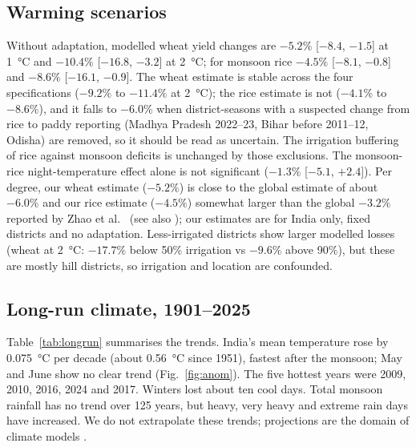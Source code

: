 \documentclass[conference]{IEEEtran}
\begin{document}
\subsection{Warming scenarios}
Without adaptation, modelled wheat yield changes are $-5.2\%$ [$-8.4$, $-1.5$] at \SI{+1}{\degreeCelsius} and
$-10.4\%$ [$-16.8$, $-3.2$] at \SI{+2}{\degreeCelsius}; for monsoon rice $-4.5\%$ [$-8.1$, $-0.8$] and $-8.6\%$
[$-16.1$, $-0.9$]. The wheat estimate is stable across the four specifications ($-9.2\%$ to $-11.4\%$ at
\SI{+2}{\degreeCelsius}); the rice estimate is not ($-4.1\%$ to $-8.6\%$), and it falls to $-6.0\%$ when district-seasons with a suspected change from rice to paddy reporting (Madhya Pradesh 2022--23, Bihar before 2011--12, Odisha) are removed, so it should be read as uncertain. The irrigation buffering of rice against monsoon deficits is unchanged by those exclusions. The
monsoon-rice night-temperature effect alone is not significant ($-1.3\%$ [$-5.1$, $+2.4$]). Per degree, our wheat
estimate ($-5.2\%$) is close to the global estimate of about $-6.0\%$ and our rice estimate ($-4.5\%$) somewhat larger than the global $-3.2\%$ reported by Zhao et al.\ \cite{zhao2017}
(see also \cite{asseng2015}); our estimates are for India only, fixed districts and no adaptation.
Less-irrigated districts show larger modelled losses (wheat at \SI{+2}{\degreeCelsius}: $-17.7\%$ below 50\% irrigation
vs $-9.6\%$ above 90\%), but these are mostly hill districts, so irrigation and location are confounded.

\subsection{Long-run climate, 1901--2025}\label{sec:longrun}
Table~\ref{tab:longrun} summarises the trends. India's mean temperature rose by \SI{0.075}{\degreeCelsius} per decade
(about \SI{0.56}{\degreeCelsius} since 1951), fastest after the monsoon; May and June show no clear trend
(Fig.~\ref{fig:anom}). The five hottest years were 2009, 2010, 2016, 2024 and 2017. Winters lost about ten cool
days. Total monsoon rainfall has no trend over 125 years, but heavy, very heavy and extreme rain days have increased.
We do not extrapolate these trends; projections are the domain of climate models \cite{krishnan2020}.
\end{document}
